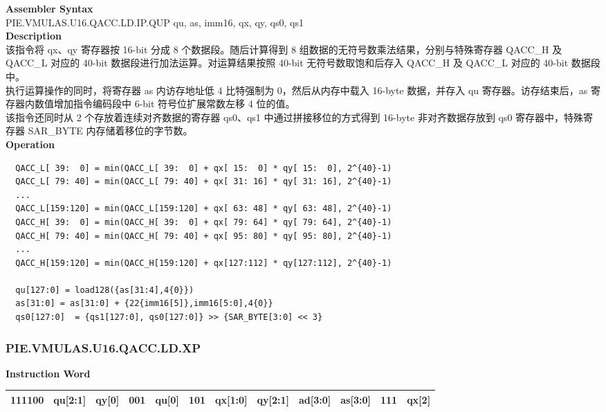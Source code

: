 \textbf{Assembler Syntax} \\
PIE.VMULAS.U16.QACC.LD.IP.QUP qu, as, imm16, qx, qy, qs0, qs1 \\
\textbf{Description} \\
该指令将 qx、qy 寄存器按 16-bit 分成 8 个数据段。随后计算得到 8 组数据的无符号数乘法结果，分别与特殊寄存器 QACC\_H 及 QACC\_L 对应的 40-bit 数据段进行加法运算。对运算结果按照 40-bit 无符号数取饱和后存入 QACC\_H 及 QACC\_L 对应的 40-bit 数据段中。\\
执行运算操作的同时，将寄存器 as 内访存地址低 4 比特强制为 0，然后从内存中载入 16-byte 数据，并存入 qu 寄存器。访存结束后，as 寄存器内数值增加指令编码段中 6-bit 符号位扩展常数左移 4 位的值。\\
该指令还同时从 2 个存放着连续对齐数据的寄存器 qs0、qs1 中通过拼接移位的方式得到 16-byte 非对齐数据存放到 qs0 寄存器中，特殊寄存器 SAR\_BYTE 内存储着移位的字节数。\\
\textbf{Operation}
\begin{lstlisting}
  QACC_L[ 39:  0] = min(QACC_L[ 39:  0] + qx[ 15:  0] * qy[ 15:  0], 2^{40}-1)
  QACC_L[ 79: 40] = min(QACC_L[ 79: 40] + qx[ 31: 16] * qy[ 31: 16], 2^{40}-1)
  ...
  QACC_L[159:120] = min(QACC_L[159:120] + qx[ 63: 48] * qy[ 63: 48], 2^{40}-1)
  QACC_H[ 39:  0] = min(QACC_H[ 39:  0] + qx[ 79: 64] * qy[ 79: 64], 2^{40}-1)
  QACC_H[ 79: 40] = min(QACC_H[ 79: 40] + qx[ 95: 80] * qy[ 95: 80], 2^{40}-1)
  ...
  QACC_H[159:120] = min(QACC_H[159:120] + qx[127:112] * qy[127:112], 2^{40}-1)

  qu[127:0] = load128({as[31:4],4{0}})
  as[31:0] = as[31:0] + {22{imm16[5]},imm16[5:0],4{0}}
  qs0[127:0]  = {qs1[127:0], qs0[127:0]} >> {SAR_BYTE[3:0] << 3}
\end{lstlisting}

\newpage
\subsubsection{PIE.VMULAS.U16.QACC.LD.XP}\label{instruction:PIEVMULASU16QACCLDXP}
\setlength\tabcolsep{6pt}
\textbf{Instruction Word} \\
\begin{tabular}{|c|c|c|c|c|c|c|c|c|c|c|c|}
	\hline
	111100 & qu[2:1] & qy[0] & 001 & qu[0] & 101 & qx[1:0] & qy[2:1] & ad[3:0] & as[3:0] & 111 & qx[2] \\
	\hline
\end{tabular}

